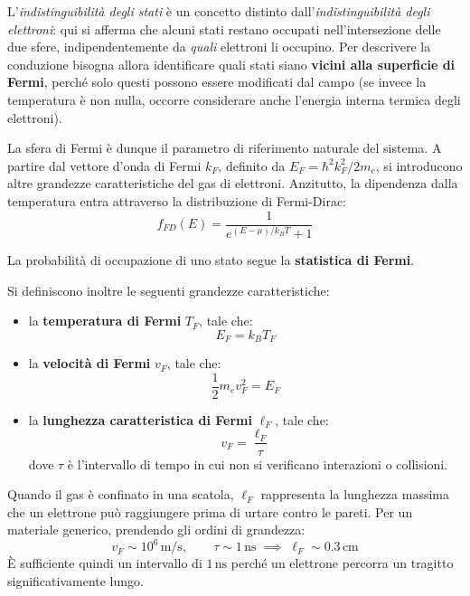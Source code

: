 \begin{remark}
L'\emph{indistinguibilità degli stati} è un concetto distinto dall'\emph{indistinguibilità degli elettroni}: qui si afferma che alcuni stati restano occupati nell'intersezione delle due sfere, indipendentemente da \emph{quali} elettroni li occupino. Per descrivere la conduzione bisogna allora identificare quali stati siano \textbf{vicini alla superficie di Fermi}, perché solo questi possono essere modificati dal campo (se invece la temperatura è non nulla, occorre considerare anche l'energia interna termica degli elettroni).
\end{remark}

La sfera di Fermi è dunque il parametro di riferimento naturale del sistema. A partire dal vettore d'onda di Fermi \(k_F\), definito da \(E_F = \hbar^2 k_F^2 / 2 m_e\), si introducono altre grandezze caratteristiche del gas di elettroni. Anzitutto, la dipendenza dalla temperatura entra attraverso la distribuzione di Fermi-Dirac:
\begin{equation}
    f_{FD}(E) = \frac{1}{e^{(E - \mu)/k_B T} + 1}
\end{equation}
\begin{remark}
La probabilità di occupazione di uno stato segue la \textbf{statistica di Fermi}.
\end{remark}

Si definiscono inoltre le seguenti grandezze caratteristiche:
\begin{itemize}
    \item la \textbf{temperatura di Fermi} \(T_F\), tale che:
    \begin{equation}
        E_F = k_B T_F
    \end{equation}
    \item la \textbf{velocità di Fermi} \(v_F\), tale che:
    \begin{equation}
        \frac{1}{2} m_e v_F^2 = E_F
    \end{equation}
    \item la \textbf{lunghezza caratteristica di Fermi} \(\ell_F\), tale che:
    \begin{equation}
        v_F = \frac{\ell_F}{\tau}
    \end{equation}
    dove \(\tau\) è l'intervallo di tempo in cui non si verificano interazioni o collisioni.
\end{itemize}

Quando il gas è confinato in una scatola, \(\ell_F\) rappresenta la lunghezza massima che un elettrone può raggiungere prima di urtare contro le pareti. Per un materiale generico, prendendo gli ordini di grandezza:
\begin{equation*}
    v_F \sim 10^6\,\text{m/s}, \qquad \tau \sim 1\,\text{ns} \;\implies\; \ell_F \sim 0.3\,\text{cm}
\end{equation*}
È sufficiente quindi un intervallo di \(1\,\text{ns}\) perché un elettrone percorra un tragitto significativamente lungo.

